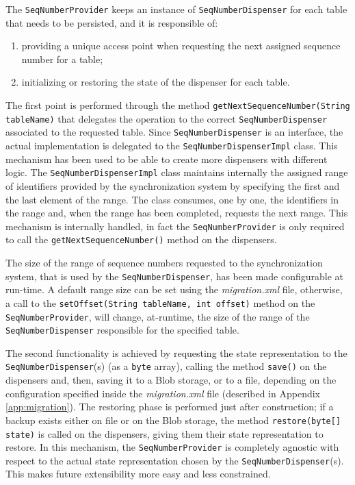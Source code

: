 \noindent The \texttt{SeqNumberProvider} keeps an instance of \texttt{SeqNumberDispenser} for each table that needs to be persisted, and it is responsible of:
\begin{enumerate}
\item providing a unique access point when requesting the next assigned sequence number for a table;
\item initializing or restoring the state of the dispenser for each table.
\end{enumerate}
\noindent The first point is performed through the method \texttt{getNextSequenceNumber(String tableName)} that delegates the operation to the correct \texttt{SeqNumberDispenser} associated to the requested table.
Since \texttt{SeqNumberDispenser} is an interface, the actual implementation is delegated to the \texttt{SeqNumberDispenserImpl} class. This mechanism has been used to be able to create more dispensers with different logic.
\noindent The \texttt{SeqNumberDispenserImpl} class maintains internally the assigned range of identifiers provided by the synchronization system by specifying the first and the last element of the range. The class consumes, one by one, the identifiers in the range and, when the range has been completed, requests the next range. This mechanism is internally handled, in fact the \texttt{SeqNumberProvider} is only required to call the \texttt{getNextSequenceNumber()} method on the dispensers.

\noindent The size of the range of sequence numbers requested to the synchronization system, that is used by the \texttt{SeqNumberDispenser}, has been made configurable at run-time. A default range size can be set using the \textit{migration.xml} file, otherwise, a call to the \texttt{setOffset(String tableName, int offset)} method on the \texttt{SeqNumberProvider}, will change, at-runtime, the size of the range of the \texttt{SeqNumberDispenser} responsible for the specified table.

\newparagraph The second functionality is achieved by requesting the state representation to the \texttt{SeqNumberDispenser}(s) (as a \texttt{byte} array), calling the method \texttt{save()} on the dispensers and, then, saving it to a Blob storage, or to a file, depending on the configuration specified inside the \textit{migration.xml} file (described in Appendix \ref{app:migration}). 
\noindent The restoring phase is performed just after construction; if a backup exists either on file or on the Blob storage, the method \texttt{restore(byte[] state)} is called on the dispensers, giving them their state representation to restore.
In this mechanism, the \texttt{SeqNumberProvider} is completely agnostic with respect to the actual state representation chosen by the \texttt{SeqNumberDispenser}(s). This makes future extensibility more easy and less constrained.

